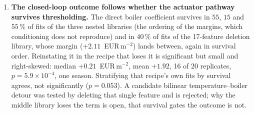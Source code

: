 \begin{enumerate}
\item \textbf{The closed-loop outcome follows whether the actuator pathway
survives thresholding.} The direct boiler coefficient survives in $55$, $15$ and
$55\,\%$ of fits of the three nested libraries (the ordering of the margins, which conditioning does not reproduce) and in $40\,\%$ of fits of the 17-feature
deletion library, whose margin ($+2.11$~EUR\,m$^{-2}$) lands between, again in
survival order. Reinstating it in the recipe that loses it is
significant but small and right-skewed: median $+0.21$~EUR\,m$^{-2}$, mean
$+1.92$, 16 of 20 replicates, $p=5.9\times10^{-4}$, one season. Stratifying that
recipe's own fits by survival agrees, not significantly ($p=0.053$). A candidate
bilinear temperature--boiler detour was tested by deleting that single feature and
is rejected; why the middle library
loses the term is open, that survival gates the outcome is not.


\end{enumerate}
